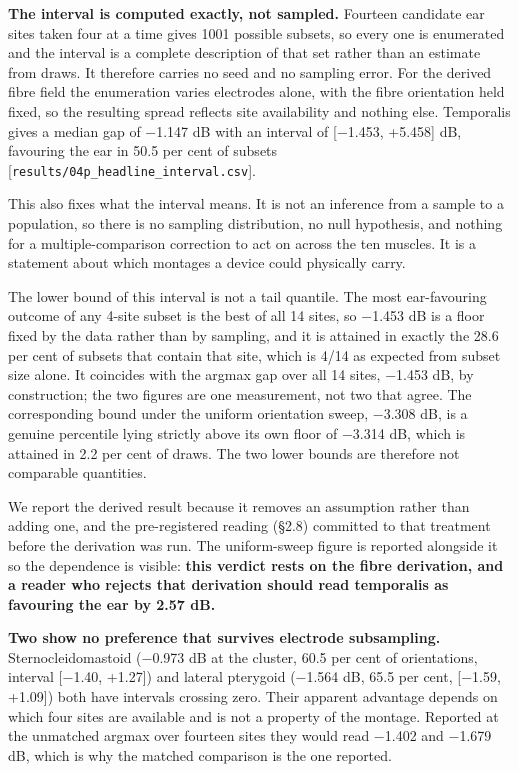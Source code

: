 \documentclass[
  11pt,
]{article}
\begin{document}
\textbf{The interval is computed exactly, not sampled.} Fourteen candidate ear sites
taken four at a time gives 1001 possible subsets, so every one is enumerated and
the interval is a complete description of that set rather than an estimate from
draws. It therefore carries no seed and no sampling error. For the derived fibre
field the enumeration varies electrodes alone, with the fibre orientation held
fixed, so the resulting spread reflects site availability and nothing else.
Temporalis gives a median gap of −1.147 dB with an interval of
{[}−1.453, +5.458{]} dB, favouring the ear in 50.5 per cent of subsets
{[}\texttt{results/04p\_headline\_interval.csv}{]}.

This also fixes what the interval means. It is not an inference from a sample to
a population, so there is no sampling distribution, no null hypothesis, and
nothing for a multiple-comparison correction to act on across the ten muscles.
It is a statement about which montages a device could physically carry.

The lower bound of this interval is not a tail quantile. The most
ear-favouring outcome of any 4-site subset is the best of all 14 sites, so
−1.453 dB is a floor fixed by the data rather than by sampling, and it is
attained in exactly the 28.6 per cent of subsets that contain that site, which is
4/14 as expected from subset size alone. It coincides with the argmax gap over all 14 sites, −1.453 dB, by
construction; the two figures are one measurement, not two that agree. The
corresponding bound under the uniform orientation sweep, −3.308 dB, is a
genuine percentile lying strictly above its own floor of −3.314 dB, which is
attained in 2.2 per cent of draws. The two lower bounds are therefore not
comparable quantities.

We report the derived result because it removes an assumption rather than
adding one, and the pre-registered reading (§2.8) committed to that treatment
before the derivation was run. The uniform-sweep figure is reported alongside
it so the dependence is visible: \textbf{this verdict rests on the fibre derivation,
and a reader who rejects that derivation should read temporalis as favouring
the ear by 2.57 dB.}

\textbf{Two show no preference that survives electrode subsampling.}
Sternocleidomastoid (−0.973 dB at the cluster, 60.5 per cent of orientations,
interval {[}−1.40, +1.27{]}) and lateral pterygoid (−1.564 dB, 65.5 per cent,
{[}−1.59, +1.09{]}) both have intervals crossing zero. Their apparent advantage
depends on which four sites are available and is not a property of the
montage. Reported at the unmatched argmax over fourteen sites they would read
−1.402 and −1.679 dB, which is why the matched comparison is the one reported.
\end{document}
